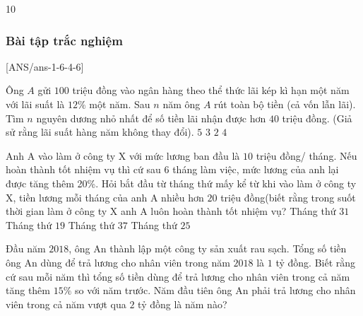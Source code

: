 \begin{indapan}{10}
\subsubsection{Bài tập trắc nghiệm}
[ANS/ans-1-6-4-6]
\begin{ex}
	Ông $A$ gửi $100$ triệu đồng vào ngân hàng theo thể thức lãi kép kì hạn một năm với lãi suất là $12\%$ một năm. Sau $n$ năm ông $A$ rút toàn bộ tiền (cả vốn lẫn lãi). Tìm $n$ nguyên dương nhỏ nhất để số tiền lãi nhận được hơn $40$ triệu đồng. (Giả sử rằng lãi suất hàng năm không thay đổi).
	\choice
	{$5$}
	{\True $3$}
	{$2$}
	{$4$}
\end{ex}
\begin{ex}
	Anh A vào làm ở công ty X với mức lương ban đầu là $10$ triệu đồng/ tháng. Nếu hoàn thành tốt nhiệm vụ thì cứ sau $6$ tháng làm việc, mức lương của anh lại được tăng thêm 20\%. Hỏi bắt đầu từ tháng thứ mấy kể từ khi vào làm ở công ty X, tiền lương mỗi tháng của anh A nhiều hơn $20$ triệu đồng(biết rằng trong suốt thời gian làm ở công ty X anh A luôn hoàn thành tốt nhiệm vụ?
	\choice
	{Tháng thứ $31$}
	{Tháng thứ $19$}
	{Tháng thứ $37$}
	{\True Tháng thứ $25$}
\end{ex}
\begin{ex}
	Đầu năm $2018$, ông An thành lập một công ty sản xuất rau sạch. Tổng số tiền ông An dùng để trả lương
	cho nhân viên trong năm $2018$ là $1$ tỷ đồng. Biết rằng cứ sau mỗi năm thì tổng số tiền dùng để trả lương cho nhân
	viên trong cả năm tăng thêm $15\%$ so với năm trước. Năm đầu tiên ông An phải trả lương cho nhân viên trong cả
	năm vượt qua $2$ tỷ đồng là năm nào?

\end{ex}
\end{indapan}
